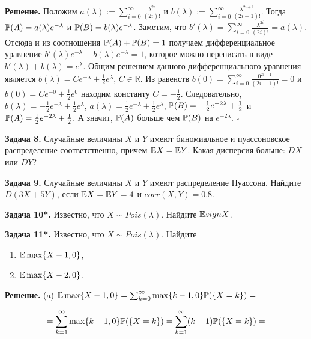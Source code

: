 \textbf{Решение.} Положим $a(\lambda ):=\sum _{i=0}^{\infty }{\tfrac{\lambda ^{2i} }{(2i)!}}  $ и $b(\lambda ):=\sum _{i=0}^{\infty }{\tfrac{\lambda ^{2i+1} }{(2i+1)!}}  $. Тогда ${\rm {\mathbb P}}(A)=a(\lambda )e^{-\lambda } $ и ${\rm {\mathbb P}}(B)=b(\lambda )e^{-\lambda } $. Заметим, что $b'(\lambda )=\sum _{i=0}^{\infty }{\tfrac{\lambda ^{2i} }{(2i)!}}  =a(\lambda )$. Отсюда и из соотношения ${\rm {\mathbb P}}(A)+{\rm {\mathbb P}}(B)=1$ получаем дифференциальное уравнение $b'(\lambda )e^{-\lambda } +b(\lambda )e^{-\lambda } =1$, которое можно переписать в виде $b'(\lambda )+b(\lambda )=e^{\lambda } $. Общим решением данного дифференциального уравнения является $b(\lambda )=Ce^{-\lambda } +{\tfrac{1}{2}} e^{\lambda } $, $C\in {\mathbb R}$. Из равенств $b(0)=\sum _{i=0}^{\infty }{\tfrac{0^{2i+1} }{(2i+1)!}} =0 $ и $b(0)=Ce^{-0} +{\tfrac{1}{2}} e^{0} $ находим константу $C=-{\tfrac{1}{2}} $. Следовательно, $b(\lambda )=-{\tfrac{1}{2}} e^{-\lambda } +{\tfrac{1}{2}} e^{\lambda } $, $a(\lambda )={\tfrac{1}{2}} e^{-\lambda } +{\tfrac{1}{2}} e^{\lambda } $, ${\rm {\mathbb P}}(B)=-{\tfrac{1}{2}} e^{-2\lambda } +{\tfrac{1}{2}} $ и ${\rm {\mathbb P}}(A)={\tfrac{1}{2}} e^{-2\lambda } +{\tfrac{1}{2}} $. А значит, ${\rm {\mathbb P}}(A)$ больше чем ${\rm {\mathbb P}}(B)$ на $e^{-2\lambda } $. $\square $

\textbf{Задача 8.} Случайные величины $X$ и $Y$ имеют биномиальное и пуассоновское распределение соответственно, причем ${\rm {\mathbb E}}X={\rm {\mathbb E}}Y$. Какая дисперсия больше: $DX$ или $DY$?

\textbf{Задача 9.} Случайные величины $X$ и $Y$ имеют распределение Пуассона. Найдите $D(3X+5Y)$, если ${\rm {\mathbb E}}X={\rm {\mathbb E}}Y=4$ и $corr(X,Y)=0.8$.

\textbf{Задача 10*.} Известно, что $X\sim Pois(\lambda )$. Найдите ${\rm {\mathbb E}}signX$. 

\textbf{Задача 11*.} Известно, что $X\sim Pois(\lambda )$. Найдите 

\begin{enumerate}
\item  ${\rm {\mathbb E}}\max \{ X-1,0\} $,

\item  ${\rm {\mathbb E}}\max \{ X-2,0\} $.
\end{enumerate}

\textbf{Решение.} (a) ${\rm {\mathbb E}}\max \{ X-1,0\} =\sum _{k=0}^{\infty }\max \{ k-1,0\} {\rm {\mathbb P}}(\{ X=k\} ) =$

\[=\sum _{k=1}^{\infty }\max \{ k-1,0\} {\rm {\mathbb P}}(\{ X=k\} ) =\sum _{k=1}^{\infty }(k-1){\rm {\mathbb P}}(\{ X=k\} ) =\] 

